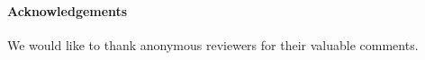 \documentclass[11pt,letterpaper]{article}
\DeclareMathOperator*{\diag}{diag}
\newcommand{\RR}[1]{{\color{blue}[{\tiny \textbf{Roshan:}\bf #1}]\marginpar{\color{blue}*}}}
\newcommand{\sgc}[1]{\textcolor{orange}{\guillemotleft \textbf{Sumanta:} #1\guillemotright}}
\newtheorem{lemma}{Lemma}[section]
\DeclareMathOperator{\ad}{adj}
\newcommand{\adj}[1]{(#1)^{\ad}}
\newcommand{\PME}{\stackrel{\mathclap{\scalebox{.4}{\mbox{PME}}}}{=}}
\newcommand{\prop}{\mathcal{R}}
\begin{document}
{{{\paragraph{Acknowledgements} We would like to thank anonymous reviewers for their valuable comments.

}}}
\end{document}
